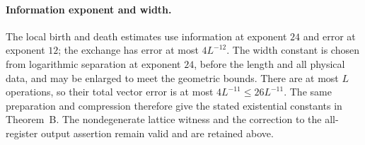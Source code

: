 \documentclass[10pt]{article}
\begin{document}
\paragraph{Information exponent and width.}
The local birth and death estimates use information at exponent $24$ and
error at exponent $12$; the exchange has error at most $4L^{-12}$.
The width constant is chosen from logarithmic separation at exponent $24$,
before the length and all physical data, and may be enlarged to meet the
geometric bounds. There are at most $L$ operations, so their total vector
error is at most $4L^{-11}\le26L^{-11}$. The same preparation and compression
therefore give the stated existential constants in Theorem~B.
The nondegenerate lattice witness and the correction to the all-register
output assertion remain valid and are retained above.



\end{document}

